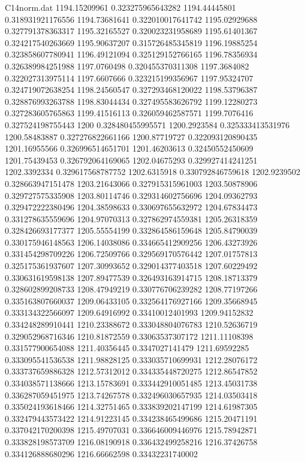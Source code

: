 \begin{filecontents}{C14norm.dat}
1194.15209961			0.323275965643282
1194.44445801			0.318931921176556
1194.73681641			0.322010017641742
1195.02929688			0.327791378363317
1195.32165527			0.320023231958689
1195.61401367			0.324217540263669
1195.90637207			0.315726485345819
1196.19885254			0.323858607780941
1196.49121094			0.325129152766165
1196.78356934			0.326389984251988
1197.0760498			0.320455370311308
1197.3684082			0.322027313975114
1197.6607666			0.323215199356967
1197.95324707			0.324719072638254
1198.24560547			0.327293468120022
1198.53796387			0.328876993263788
1198.83044434			0.327495583626792
1199.12280273			0.327283605765863
1199.41516113			0.326059462587571
1199.7076416			0.327524198755443
1200			0.328480455995571
1200.2923584			0.325333413531976
1200.58483887			0.327276822661166
1200.87719727			0.322093120890435
1201.16955566			0.326996514651701
1201.46203613			0.32450552450609
1201.75439453			0.326792064169065
1202.04675293			0.329927414241251
1202.3392334			0.329617568787752
1202.6315918			0.330792846759618
1202.9239502			0.328663947151478
1203.21643066			0.327915315961003
1203.50878906			0.329727575335908
1203.80114746			0.329314602756696
1204.09362793			0.329472222380496
1204.38598633			0.330697655632972
1204.67834473			0.331278635559696
1204.97070313			0.327862974559381
1205.26318359			0.328426693177377
1205.55554199			0.332864586159648
1205.84790039			0.330175946148563
1206.14038086			0.334665412909256
1206.43273926			0.331454298709226
1206.72509766			0.329569170576442
1207.01757813			0.325175361937607
1207.30993652			0.329014377403518
1207.60229492			0.330631619598138
1207.89477539			0.326493163914715
1208.18713379			0.328602899208733
1208.47949219			0.330776706239282
1208.77197266			0.335163807660037
1209.06433105			0.332564176927166
1209.35668945			0.333134322566097
1209.64916992			0.33410012401993
1209.94152832			0.334248289910441
1210.23388672			0.333048804076783
1210.52636719			0.329052968716346
1210.81872559			0.33063537307172
1211.11108398			0.331577900654088
1211.40356445			0.3347027141479
1211.69592285			0.333095541536538
1211.98828125			0.333035710699931
1212.28076172			0.333737659886328
1212.57312012			0.334335448720275
1212.86547852			0.334038571138666
1213.15783691			0.333442910051485
1213.45031738			0.336287059451975
1213.74267578			0.332496030657935
1214.03503418			0.335024193618466
1214.32751465			0.333839202147199
1214.61987305			0.332479443573422
1214.91223145			0.334238465499686
1215.20471191			0.337042170200398
1215.49707031			0.336646009446976
1215.78942871			0.333828198573709
1216.08190918			0.336432499258216
1216.37426758			0.334126888680296
1216.66662598			0.33432231740002

\end{filecontents}
